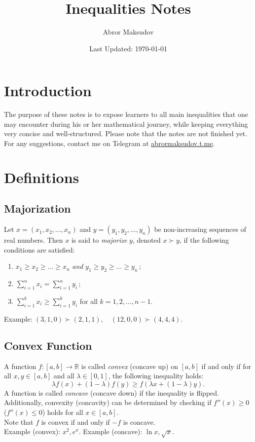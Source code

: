 \documentclass[a4paper,11pt]{article}
\title{Inequalities Notes}
\author{Abror Maksudov}
\date{Last Updated: \today}
\begin{document}
\maketitle
\tableofcontents

\section{Introduction}
The purpose of these notes is to expose learners to all main inequalities that one may encounter during his or her mathematical journey, while keeping everything very concise and well-structured. Please note that the notes are not finished yet. For any suggestions, contact me on Telegram at \href{https://abrormaksudov.t.me}{abrormaksudov.t.me}.


\section{Definitions}


\subsection{Majorization}
\begin{tcolorbox}[breakable]
    Let $x = (x_1, x_2, \dots, x_n)$ and $y = (y_1, y_2, \dots, y_n)$ be non-increasing sequences of real numbers. Then $x$ is said to \emph{majorize} $y$, denoted $x \succ y$, if the following conditions are satisfied:
    \begin{enumerate}
        \item $x_1 \geq x_2 \geq \dots \geq x_n$ \emph{and} $y_1 \geq y_2 \geq \dots \geq y_n$\,;
        \item $\sum_{i=1}^n x_i = \sum_{i=1}^n y_i$\,;
        \item $\sum_{i=1}^k x_i \geq \sum_{i=1}^k y_i$ for all $k = 1, 2, \dots, n-1$.
    \end{enumerate}
    Example: $(3,1,0) \succ (2,1,1), \quad (12, 0,0) \succ (4,4,4)$.
\end{tcolorbox}


\subsection{Convex Function}
\begin{tcolorbox}[breakable]
    A function $f : [a,b] \to \mathbb{R}$ is called \textit{convex} (concave up) on $[a,b]$ if and only if for all $x,y \in [a,b]$ and all $\lambda \in [0,1]$, the following inequality holds:
    \[
    \lambda f(x) + (1-\lambda)f(y) \geq f(\lambda x + (1-\lambda)y).
    \]
    A function is called \textit{concave} (concave down) if the inequality is flipped. \\[6pt]
    Additionally, convexity (concavity) can be determined by checking if $f''(x) \geq 0$ \newline ($f''(x) \leq 0$) holds for all $x \in [a,b]$. \\[6pt]
    Note that $f$ is convex if and only if $-f$ is concave. \\[6pt]
    Example (convex): $x^2, e^x$. Example (concave): $\ln{x}, \sqrt{x}$.
\end{tcolorbox}
\end{document}
